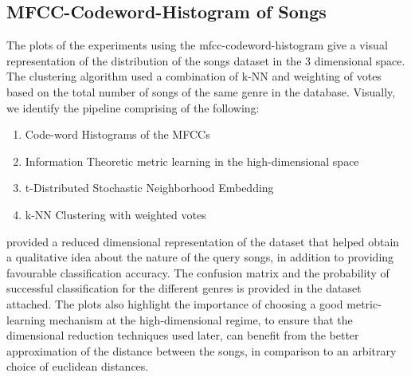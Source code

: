 \documentclass[10pt]{article}
\begin{document}
\pagebreak
\subsection{MFCC-Codeword-Histogram of Songs }


The plots of the experiments using the mfcc-codeword-histogram give a visual representation of the distribution of the songs dataset in the 3 dimensional space. The clustering algorithm used a combination of k-NN and weighting of votes based on the total number of songs of the same genre in the database. Visually, we identify the pipeline comprising of the following:
\begin{enumerate}
\item Code-word Histograms of the MFCCs
\item Information Theoretic metric learning in the high-dimensional space
\item t-Distributed Stochastic Neighborhood Embedding
\item k-NN Clustering with weighted votes
\end{enumerate} 
provided a reduced dimensional representation of the dataset that helped obtain a qualitative idea about the nature of the query songs, in addition to providing favourable classification accuracy. The confusion matrix and the probability of successful classification for the different genres is provided in the dataset attached. 
The plots also highlight the importance of choosing a good metric-learning mechanism at the high-dimensional regime, to ensure that the dimensional reduction techniques used later, can benefit from the better approximation of the distance between the songs, in comparison to an arbitrary choice of euclidean distances. 
\end{document}
